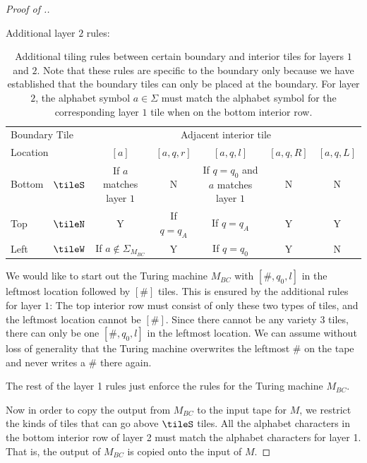 \begin{proof}[Proof of .]
\begin{table}
\begin{centering}
\bigskip

\end{centering}
\noindent Additional layer $2$ rules:
\smallskip
\begin{centering}
\begin{tabular}{lc|ccccc}

\multicolumn{2}{l|}{Boundary Tile} &                \multicolumn{5}{c}{Adjacent interior tile} \\
\multicolumn{2}{l|}{Location} & $[a]$         & $[a,q,r]$  & $[a,q,l]$                            & $[a,q,R]$ & $[a,q,L]$ \\
 \hline
Bottom  & $\tileS$ & If $a$ matches layer $1$ &     N
& \parbox{30mm}{\centering If $q=q_0$ and\\ $a$ matches layer $1$} &    N      &    N      \\
Top     & $\tileN$ &   Y                      & If $q=q_A$ & If $q=q_A$                           &    Y      &    Y      \\
Left    & $\tileW$ & If $a \not\in \Sigma_{M_{BC}}$ &  Y   & If $q=q_0$                           &    Y      &    N      \\
\end{tabular}

\caption{Additional tiling rules between certain boundary and interior tiles for
layers $1$ and $2$.  Note that these rules are specific to the boundary
only because we have established that the boundary tiles can only
be placed at the boundary.
For layer $2$, the alphabet symbol $a \in \Sigma$ must match the alphabet symbol for the corresponding layer $1$ tile when on the bottom interior row.}
\label{table:TMboundaries}
\end{centering}
\end{table}

We would like to start out the
Turing machine $M_{BC}$ with $[\#, q_0, l]$ in the leftmost location
followed by $[\#]$ tiles.  This is ensured by the additional rules for layer $1$: The top interior row must consist of only these two types of tiles, and the leftmost location cannot be $[\#]$.  Since there cannot be any variety 3 tiles, there can only be one $[\#, q_0, l]$ in the leftmost location.
We can assume without loss of generality that
the Turing machine overwrites the leftmost $\#$ on the tape
and never writes a $\#$ there again.

The rest of the layer 1 rules just enforce the rules for the Turing machine
$M_{BC}$.

Now in order to copy the output from $M_{BC}$ to the input tape
for $M$, we restrict the kinds of tiles that can go above $\tileS$ tiles.
All the alphabet characters in the bottom interior row of layer 2 must
match the alphabet characters for layer 1.  That is, the output of $M_{BC}$ is
copied onto the input of $M$.


\end{proof}

